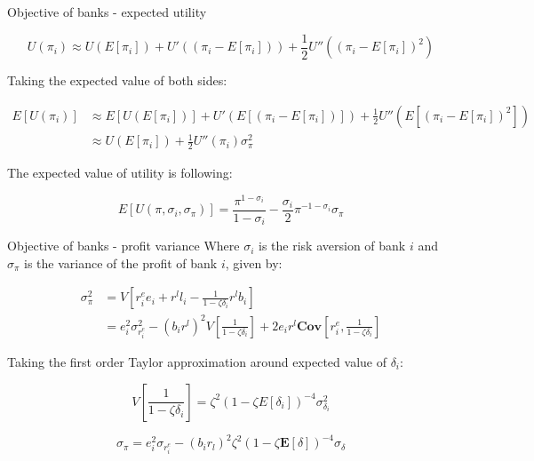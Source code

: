 \documentclass{beamer}
\begin{document}
\begin{frame}{Objective of banks - expected utility}

    \[U(\pi_i) \approx U(E[\pi_i]) + U'((\pi_i - E[\pi_i])) + \frac{1}{2} U''((\pi_i - E[\pi_i])^2)\]

Taking the expected value of both sides:

\begin{equation}
  \begin{aligned}
    E[U(\pi_i)] &\approx E[U(E[\pi_i])] + U'(E[(\pi_i - E[\pi_i])]) + \frac{1}{2} U''(E[(\pi_i - E[\pi_i])^2]) \\
     &\approx U(E[\pi_i]) + \frac{1}{2} U''(\pi_i) \sigma^2_{\pi}
  \end{aligned}\nonumber
\end{equation}

The expected value of utility is following:

\[ E[U(\pi, \sigma_i, \sigma_\pi)] = \frac{\pi^{1-\sigma_i}}{1 - \sigma_i} - \frac{\sigma_i}{2} \pi^{-1-\sigma_i} \sigma_\pi\]

\end{frame}

\begin{frame}{Objective of banks - profit variance}
    Where $\sigma_i$ is the risk aversion of bank $i$ and $\sigma_\pi$ is the variance of the profit of bank $i$, given by:
        
    \begin{equation}
        \begin{aligned}
          \sigma^2_\pi &= V[r^e_i e_i + r^l l_i - \frac{1}{1 - \zeta \delta_i} r^l b_i] \\
          &= e_i^2 \sigma^2_{r^e_i} - (b_i r^l)^2 V[\frac{1}{1 - \zeta \delta_i}] + 2 e_i r^l \textbf{Cov}[r^e_i, \frac{1}{1 - \zeta \delta_i}]
        \end{aligned}\nonumber
      \end{equation}
      
      Taking the first order Taylor approximation around expected value of $\delta_i$:
      
      \[V[\frac{1}{1 - \zeta \delta_i}] = \zeta^2 (1 - \zeta E[\delta_i])^{-4} \sigma^2_{\delta_i}\]

      \[\sigma_\pi = e_i^2 \sigma_{r_i^e} - (b_i  r_l)^2  \zeta^2 (1 - \zeta \mathbf{E}[\delta])^{-4}  \sigma_\delta\]
      
\end{frame}
\end{document}
